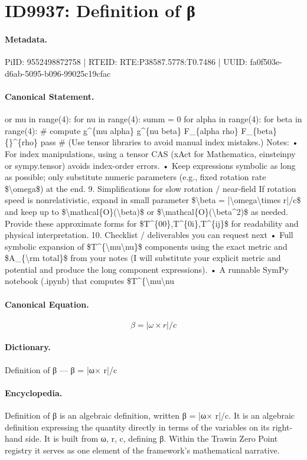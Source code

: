 \section*{ID9937: Definition of β}
\paragraph{Metadata.}
PiID: 9552498872758 | RTEID: RTE:P38587.5778:T0.7486 | UUID: fa0f503e-d6ab-5095-b096-99025c19cfac

\paragraph{Canonical Statement.}
or mu in range(4): for nu in range(4): summ = 0 for alpha in range(4): for beta in range(4): \# compute g\textasciicircum{}\{mu alpha\} g\textasciicircum{}\{nu beta\} F\_\{alpha rho\} F\_\{beta\}\{\}\textasciicircum{}\{rho\} pass \# (Use tensor libraries to avoid manual index mistakes.) Notes: • For index manipulations, using a tensor CAS (xAct for Mathematica, einsteinpy or sympy.tensor) avoids index-order errors. • Keep expressions symbolic as long as possible; only substitute numeric parameters (e.g., fixed rotation rate \$\textbackslash{}omega\$) at the end. 9. Simplifications for slow rotation / near-field If rotation speed is nonrelativistic, expand in small parameter \$\textbackslash{}beta = |\textbackslash{}omega\textbackslash{}times r|/c\$ and keep up to \$\textbackslash{}mathcal\{O\}(\textbackslash{}beta)\$ or \$\textbackslash{}mathcal\{O\}(\textbackslash{}beta\textasciicircum{}2)\$ as needed. Provide these approximate forms for \$T\textasciicircum{}\{00\},T\textasciicircum{}\{0i\},T\textasciicircum{}\{ij\}\$ for readability and physical interpretation. 10. Checklist / deliverables you can request next • Full symbolic expansion of \$T\textasciicircum{}\{\textbackslash{}mu\textbackslash{}nu\}\$ components using the exact metric and \$A\_\{\textbackslash{}rm total\}\$ from your notes (I will substitute your explicit metric and potential and produce the long component expressions). • A runnable SymPy notebook (.ipynb) that computes \$T\textasciicircum{}\{\textbackslash{}mu\textbackslash{}nu

\paragraph{Canonical Equation.}
\[
\beta = |\omega\times r|/c
\]

\paragraph{Dictionary.}
Definition of β — β = |ω× r|/c

\paragraph{Encyclopedia.}
Definition of β is an algebraic definition, written β = |ω× r|/c. It is an algebraic definition expressing the quantity directly in terms of the variables on its right-hand side. It is built from ω, r, c, defining β. Within the Trawin Zero Point registry it serves as one element of the framework's mathematical narrative.

